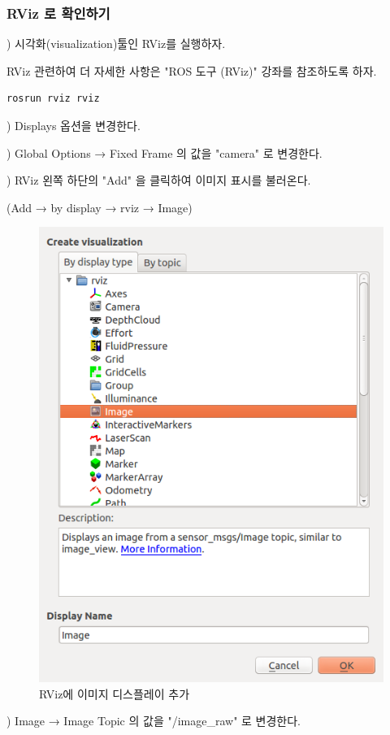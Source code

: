 \subsubsection{RViz 로 확인하기}

\setcounter{num}{0}

\noindent
{}\thenum) 시각화(visualization)툴인 RViz를 실행하자.

\noindent
RViz 관련하여 더 자세한 사항은 "ROS 도구 (RViz)" 강좌를 참조하도록 하자.

\begin{lstlisting}[language=ROS]
rosrun rviz rviz
\end{lstlisting}

\noindent
{}\thenum) Displays 옵션을 변경한다.

\vspace{\baselineskip}
\noindent
{}) Global Options → Fixed Frame 의 값을 "camera" 로 변경한다.

\vspace{\baselineskip}
\noindent
{}) RViz 왼쪽 하단의 "Add" 을 클릭하여 이미지 표시를 불러온다.

\noindent
(Add → by display → rviz → Image)

\begin{figure}[h]
\centering\includegraphics[width=0.5\columnwidth]{pictures/chapter9/add_display_of_rviz.png}
\caption{RViz에 이미지 디스플레이 추가}
\end{figure}

\vspace{\baselineskip}
\noindent
{}) Image → Image Topic 의 값을 "/image\_raw" 로 변경한다.

